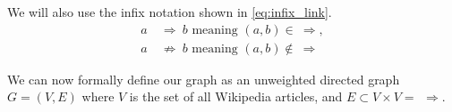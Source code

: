 We will also use the infix notation shown in \cref{eq:infix_link}.
\begin{equation}
\label{eq:infix_link}
  \begin{split}
    a\ & \Rightarrow\ b \text{ meaning } (a,b) \in\ \Rightarrow,\\
    a\ & \not\Rightarrow\ b \text{ meaning } (a,b) \not\in\ \Rightarrow
  \end{split}
\end{equation}

We can now formally define our graph as an unweighted directed graph $G = (V,E)$ where $V$ is the set of all Wikipedia articles, and $E\subset V \times V = \ \, \Rightarrow$.